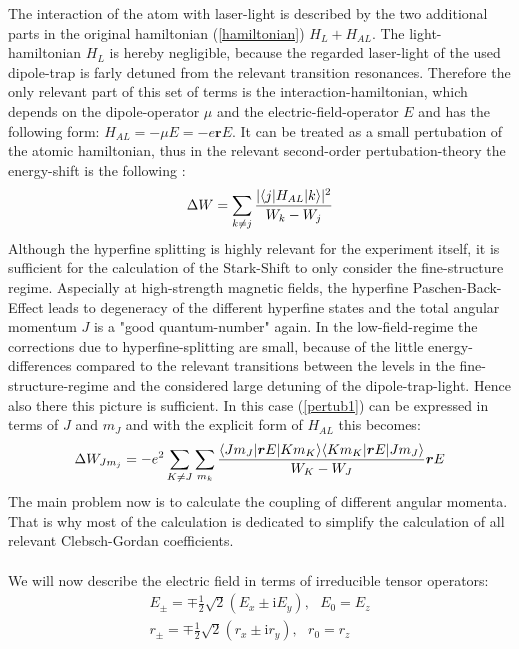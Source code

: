 The interaction of the atom with laser-light is described by the two additional parts in the original hamiltonian (\ref{hamiltonian}) $H_L+H_{AL}$. The light-hamiltonian $H_L$ is hereby negligible, because the regarded laser-light of the used dipole-trap is farly detuned from the relevant transition resonances. Therefore the only relevant part of this set of terms is the interaction-hamiltonian, which depends on the dipole-operator $\mu$ and the electric-field-operator $E$ and has the following form: $H_{AL}=-\mu E=-e\boldsymbol{r} E$. It can be treated as a small pertubation of the atomic hamiltonian, thus in the relevant second-order pertubation-theory the energy-shift is the following \cite{dipole}:
\begin{equation}
\Delta W=\sum_{k\neq j}\frac{|\langle j| H_{AL} | k\rangle|^2}{W_k-W_j}
\label{pertub1}
\end{equation}
Although the hyperfine splitting is highly relevant for the experiment itself, it is sufficient for the calculation of the Stark-Shift to only consider the fine-structure regime. Aspecially at high-strength magnetic fields, the hyperfine Paschen-Back-Effect leads to degeneracy of the different hyperfine states and the total angular momentum $J$ is a "good quantum-number" again. In the low-field-regime the corrections due to hyperfine-splitting are small, because of the little energy-differences compared to the relevant transitions between the levels in the fine-structure-regime and the considered large detuning of the dipole-trap-light. Hence also there this picture is sufficient. In this case (\ref{pertub1}) can be expressed in terms of $J$ and $m_J$ and with the explicit form of $H_{AL}$ this becomes\cite{alpha}:
\begin{equation}
\Delta W_{Jm_j}=-e^2\sum_{K\neq J}\sum_{m_k}\frac{\langle Jm_J| \boldsymbol{r}E | Km_K\rangle\langle Km_K| \boldsymbol{r}E | Jm_J\rangle}{W_K-W_J}\boldsymbol{r}E\label{pertub2}
\end{equation}
The main problem now is to calculate the coupling of different angular momenta. That is why most of the calculation is dedicated to simplify the calculation of all relevant Clebsch-Gordan coefficients.\\\\
We will now describe the electric field in terms of irreducible tensor operators:
\begin{align}
E_{\pm}=\mp\frac{1}{2}\sqrt{2}(E_x\pm \mathrm{i}E_y),\ \ \ E_0=E_z\\
r_{\pm}=\mp\frac{1}{2}\sqrt{2}(r_x\pm \mathrm{i}r_y),\ \ \ r_0=r_z\\
\end{align}
